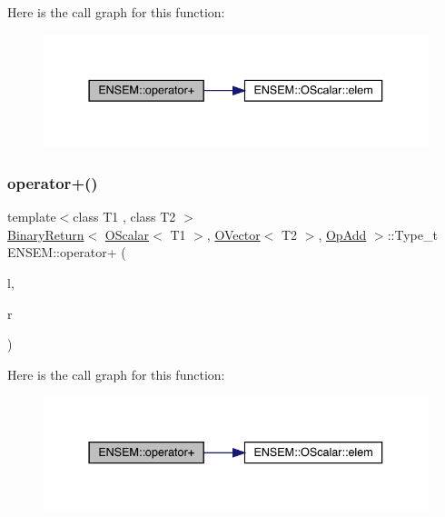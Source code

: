Here is the call graph for this function\+:\nopagebreak
\begin{figure}[H]
\begin{center}
\leavevmode
\includegraphics[width=337pt]{da/d59/group__obsvector_gaff6b0407180422eb54c7c31f17d340e3_cgraph}
\end{center}
\end{figure}
\mbox{\label{group__obsvector_ga19b9d8af56a96f2d3b3455fe4ec1f98f}} 
\subsubsection{\texorpdfstring{operator+()}{operator+()}\hspace{0.1cm}{\footnotesize\ttfamily [4/4]}}
{\footnotesize\ttfamily template$<$class T1 , class T2 $>$ \\
\mbox{\hyperlink{structENSEM_1_1BinaryReturn}{Binary\+Return}}$<$ \mbox{\hyperlink{classENSEM_1_1OScalar}{O\+Scalar}}$<$ T1 $>$, \mbox{\hyperlink{classENSEM_1_1OVector}{O\+Vector}}$<$ T2 $>$, \mbox{\hyperlink{structENSEM_1_1OpAdd}{Op\+Add}} $>$\+::Type\+\_\+t E\+N\+S\+E\+M\+::operator+ (\begin{DoxyParamCaption}\item[{const \mbox{\hyperlink{classENSEM_1_1OScalar}{O\+Scalar}}$<$ T1 $>$ \&}]{l,  }\item[{const \mbox{\hyperlink{classENSEM_1_1OVector}{O\+Vector}}$<$ T2 $>$ \&}]{r }\end{DoxyParamCaption})\hspace{0.3cm}{\ttfamily [inline]}}

Here is the call graph for this function\+:\nopagebreak
\begin{figure}[H]
\begin{center}
\leavevmode
\includegraphics[width=337pt]{da/d59/group__obsvector_ga19b9d8af56a96f2d3b3455fe4ec1f98f_cgraph}
\end{center}
\end{figure}
\mbox{\label{group__obsvector_ga914cf43b5cebf3dc6244c6f4f82435be}} 
